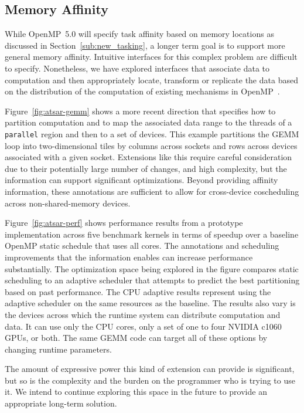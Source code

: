 \subsection{Memory Affinity}
\label{sub:memory_affinity}

While OpenMP~5.0 will specify task affinity based on memory locations 
as discussed in Section~\ref{sub:new_tasking}, a longer term goal is to 
support more general memory affinity. Intuitive interfaces for this complex 
problem are difficult to specify. Nonetheless, we have explored interfaces
that associate data to computation and then appropriately locate, transform 
or replicate the data based on the distribution of the computation of existing
mechanisms in OpenMP~\cite{ctsar-tpds,scogland:7Hpt64iV}.
 
Figure~\ref{fig:atsar-gemm} shows a more recent direction that specifies how
to partition computation and to map the associated data range to the threads 
of a \texttt{parallel} region and then to a set of devices. This example 
partitions the GEMM loop into two-dimensional tiles by columns across sockets 
and rows across devices associated with a given socket. Extensions like this 
require careful consideration due to their potentially large number of changes,
and high complexity, but the information can support significant optimizations.
Beyond providing affinity information, these annotations are sufficient to 
allow for cross-device coscheduling across non-shared-memory devices.

Figure~\ref{fig:atsar-perf} shows performance results from a prototype 
implementation across five benchmark kernels in terms of speedup over a 
baseline OpenMP static schedule that uses all cores. The annotations and 
scheduling improvements that the information enables can increase performance 
substantially.  The optimization space being explored in the figure compares
static scheduling to an adaptive scheduler that attempts to predict the best 
partitioning based on past performance. The CPU adaptive results represent 
using the adaptive scheduler on the same resources as the baseline. The 
results also vary is the devices across which the runtime system can 
distribute computation and data. It can use only the CPU cores, only a
set of one to four NVIDIA c1060 GPUs, or both. The same GEMM code can target
all of these options by changing runtime parameters.

The amount of expressive power this kind of extension can provide is
significant, but so is the complexity and the burden on the programmer who is
trying to use it.  We intend to continue exploring this space in the future to
provide an appropriate long-term solution.

